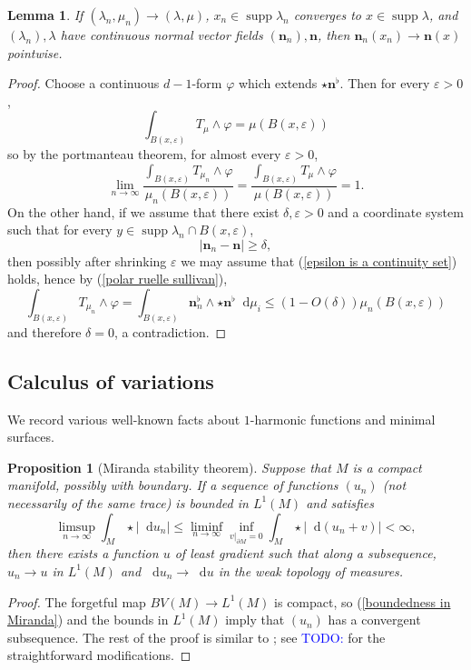 \documentclass[final,12pt, leqno]{brownthesis}
\newcommand{\todo}[1]{\textcolor{blue}{TODO: #1}}
\DeclareMathOperator{\supp}{supp}
\newcommand*\dif{\mathop{}\!\mathrm{d}}
\newcommand{\normal}{\mathbf n}
\newtheorem{lemma}[theorem]{Lemma}
\newtheorem{proposition}[theorem]{Proposition}
\theoremstyle{definition}
\numberwithin{equation}{section}
\begin{document}
\begin{lemma}\label{convergence of normals}
If $(\lambda_n, \mu_n) \to (\lambda, \mu)$, $x_n \in \supp \lambda_n$ converges to $x \in \supp \lambda$, and $(\lambda_n), \lambda$ have continuous normal vector fields $(\normal_n), \normal$, then $\normal_n(x_n) \to \normal(x)$ pointwise.
\end{lemma}
\begin{proof}
	Choose a continuous $d-1$-form $\varphi$ which extends $\star \normal^\flat$.
	Then for every $\varepsilon > 0$,
	$$\int_{B(x, \varepsilon)} T_\mu \wedge \varphi = \mu(B(x, \varepsilon))$$
	so by the portmanteau theorem, for almost every $\varepsilon > 0$,
	\begin{equation}\label{epsilon is a continuity set}
		\lim_{n \to \infty} \frac{\int_{B(x, \varepsilon)} T_{\mu_n} \wedge \varphi}{\mu_n(B(x, \varepsilon))} = \frac{\int_{B(x, \varepsilon)} T_\mu \wedge \varphi}{\mu(B(x, \varepsilon))} = 1.
	\end{equation}
	On the other hand, if we assume that there exist $\delta, \varepsilon > 0$ and a coordinate system such that for every $y \in \supp \lambda_n \cap B(x, \varepsilon)$,
	$$|\normal_n - \normal| \geq \delta,$$
	then possibly after shrinking $\varepsilon$ we may assume that (\ref{epsilon is a continuity set}) holds, hence by (\ref{polar ruelle sullivan}),
	$$\int_{B(x, \varepsilon)} T_{\mu_n} \wedge \varphi = \int_{B(x, \varepsilon)} \normal_n^\flat \wedge \star \normal^\flat \dif \mu_i \leq (1 - O(\delta)) \mu_n(B(x, \varepsilon))$$
	and therefore $\delta = 0$, a contradiction.
\end{proof}


\subsection{Calculus of variations}
We record various well-known facts about $1$-harmonic functions and minimal surfaces.

\begin{proposition}[Miranda stability theorem]
  Suppose that $M$ is a compact manifold, possibly with boundary.
	If a sequence of functions $(u_n)$ (not necessarily of the same trace) is bounded in $L^1(M)$ and satisfies
\begin{equation}\label{boundedness in Miranda}
	\limsup_{n \to \infty} \int_M \star |\dif u_n| \leq \liminf_{n \to \infty} \inf_{v|_{\partial M} = 0} \int_M \star |\dif(u_n + v)| < \infty,
\end{equation}
	then there exists a function $u$ of least gradient such that along a subsequence, $u_n \to u$ in $L^1(M)$ and $\dif u_n \to \dif u$ in the weak topology of measures.
\end{proposition}
\begin{proof}
The forgetful map $BV(M) \to L^1(M)$ is compact, so (\ref{boundedness in Miranda}) and the bounds in $L^1(M)$ imply that $(u_n)$ has a convergent subsequence.
The rest of the proof is similar to \cite[Teorema 3 and Osservazione 3]{Miranda67}; see \todo{\cite{BackusFLG}} for the straightforward modifications.
\end{proof}
\end{document}
